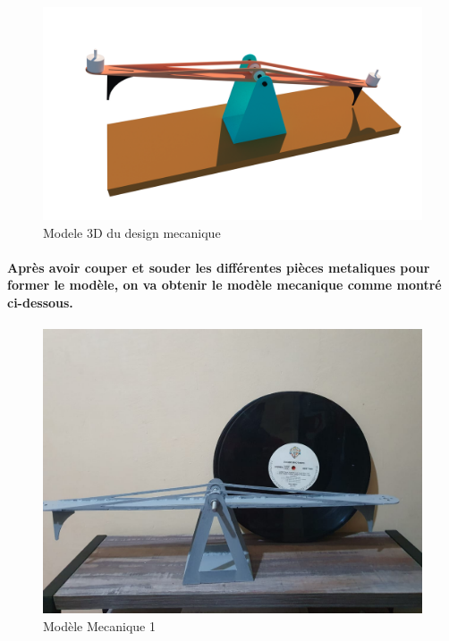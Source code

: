 \paragraph*{}
\begin{figure}[!htpb]
	\centering
	\includegraphics[width=\linewidth]{Figures/3d-cad.png}
	\caption{Modele 3D du design mecanique}
	\label{fig:3d-model}
\end{figure}

\newpage
\paragraph{Après avoir couper et souder les différentes pièces metaliques pour former le modèle, on va obtenir le modèle mecanique comme montré ci-dessous.}
\paragraph*{}
\begin{figure}[!htpb]
	\centering
	\includegraphics[width=0.8\linewidth]{Figures/model-mec-1.jpeg}
	\caption{Modèle Mecanique 1}
	\label{fig:real-model}
\end{figure}

